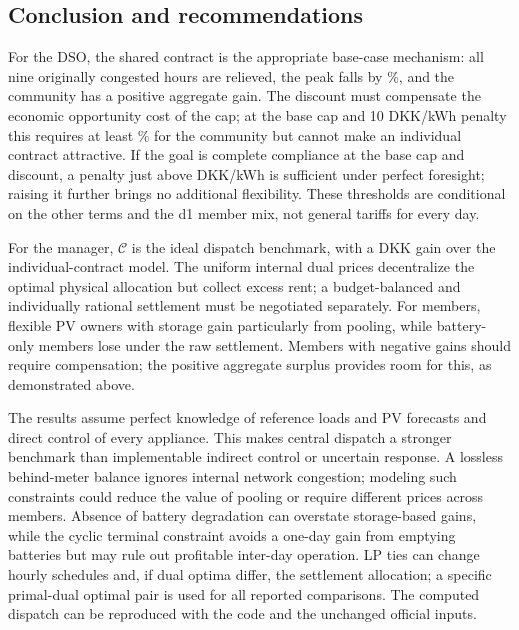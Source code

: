 \documentclass[10pt,a4paper]{article}
\newcommand{\Cmod}{\mathcal C}
\begin{document}
\subsection{Conclusion and recommendations}
For the DSO, the shared contract is the appropriate base-case mechanism: all nine originally congested hours are relieved, the peak falls by \Cpeakpct\%, and the community has a positive aggregate gain. The discount must compensate the economic opportunity cost of the cap; at the base cap and 10 DKK/kWh penalty this requires at least \BetastarC\% for the community but cannot make an individual contract attractive. If the goal is complete compliance at the base cap and discount, a penalty just above \AlphasafeC{} DKK/kWh is sufficient under perfect foresight; raising it further brings no additional flexibility. These thresholds are conditional on the other terms and the d1 member mix, not general tariffs for every day.

For the manager, $\Cmod$ is the ideal dispatch benchmark, with a \Poolinggain{} DKK gain over the individual-contract model. The uniform internal dual prices decentralize the optimal physical allocation but collect excess rent; a budget-balanced and individually rational settlement must be negotiated separately. For members, flexible PV owners with storage gain particularly from pooling, while battery-only members lose under the raw settlement. Members with negative gains should require compensation; the positive aggregate surplus provides room for this, as demonstrated above.

The results assume perfect knowledge of reference loads and PV forecasts and direct control of every appliance. This makes central dispatch a stronger benchmark than implementable indirect control or uncertain response. A lossless behind-meter balance ignores internal network congestion; modeling such constraints could reduce the value of pooling or require different prices across members. Absence of battery degradation can overstate storage-based gains, while the cyclic terminal constraint avoids a one-day gain from emptying batteries but may rule out profitable inter-day operation. LP ties can change hourly schedules and, if dual optima differ, the settlement allocation; a specific primal-dual optimal pair is used for all reported comparisons. The computed dispatch can be reproduced with the code and the unchanged official inputs.

\appendix
\small
\end{document}
